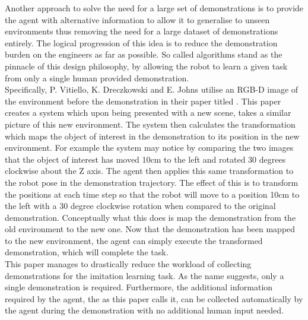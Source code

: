 Another approach to solve the need for a large set of demonstrations is to provide the agent with alternative information to allow it to generalise to unseen environments thus removing the need for a large dataset of demonstrations entirely. The logical progression of this idea is to reduce the demonstration burden on the engineers as far as possible. So called  algorithms stand as the pinnacle of this design philosophy, by allowing the robot to learn a given task from only a single human provided demonstration.\\

Specifically, P. Vitiello, K. Dreczkowski and E. Johns utilise an RGB-D image of the environment before the demonstration in their paper titled  \cite{one-shot-pose-estimate}. This paper creates a system which upon being presented with a new scene, takes a similar picture of this new environment. The system then calculates the transformation which maps the object of interest in the demonstration to its position in the new environment. For example the system may notice by comparing the two images that the object of interest has moved 10cm to the left and rotated 30 degrees clockwise about the Z axis. The agent then applies this same transformation to the robot pose in the demonstration trajectory. The effect of this is to transform the positions at each time step so that the robot will move to a position 10cm to the left with a 30 degree clockwise rotation when compared to the original demonstration. Conceptually what this does is map the demonstration from the old environment to the new one. Now that the demonstration has been mapped to the new environment, the agent can simply execute the transformed demonstration, which will complete the task.\\
This paper manages to drastically reduce the workload of collecting demonstrations for the imitation learning task. As the name  suggests, only a single demonstration is required. Furthermore, the additional information required by the agent, the  as this paper calls it, can be collected automatically by the agent during the demonstration with no additional human input needed.\\

